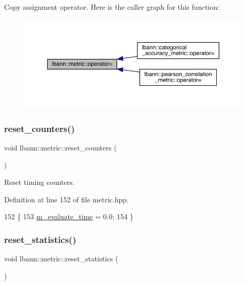 Copy assignment operator. Here is the caller graph for this function\+:\nopagebreak
\begin{figure}[H]
\begin{center}
\leavevmode
\includegraphics[width=350pt]{classlbann_1_1metric_a4324342dab4892199a47df1d78b2cef5_icgraph}
\end{center}
\end{figure}
\mbox{\label{classlbann_1_1metric_ab93708cd870277eb7865655e075620c9}} 
\subsubsection{\texorpdfstring{reset\+\_\+counters()}{reset\_counters()}}
{\footnotesize\ttfamily void lbann\+::metric\+::reset\+\_\+counters (\begin{DoxyParamCaption}{ }\end{DoxyParamCaption})\hspace{0.3cm}{\ttfamily [inline]}}

Reset timing counters. 

Definition at line 152 of file metric.\+hpp.


\begin{DoxyCode}
152                         \{
153     \hyperlink{classlbann_1_1metric_a4c77a1bd1db77e9d837a72128e3d687f}{m\_evaluate\_time} = 0.0;
154   \}
\end{DoxyCode}
\mbox{\label{classlbann_1_1metric_af7747feb8bc7a5ee039876a70fae1b0c}} 
\subsubsection{\texorpdfstring{reset\+\_\+statistics()}{reset\_statistics()}\hspace{0.1cm}{\footnotesize\ttfamily [1/2]}}
{\footnotesize\ttfamily void lbann\+::metric\+::reset\+\_\+statistics (\begin{DoxyParamCaption}{ }\end{DoxyParamCaption})\hspace{0.3cm}{\ttfamily [inline]}}

